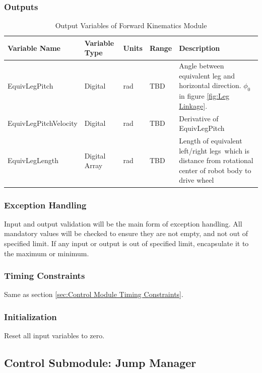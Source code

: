 \documentclass[12pt]{article}
\begin{document}
        \subsubsection{Outputs}
            \begin{table}[H]
              \centering
                \caption{Output Variables of Forward Kinematics Module} \label{tbl:Output Variables of Forward Kinematics Module}
              \begin{tabularx}{\textwidth}{|p{6cm}|p{1.2cm}|p{1.2cm}|p{1cm}|X|}
                \hline Variable Name & Variable Type & Units & Range & Description \\
                \hline EquivLegPitch & Digital & rad & TBD & Angle between equivalent leg and horizontal direction. $\phi_0$ in figure \ref{fig:Leg Linkage}.\\
                \hline EquivLegPitchVelocity & Digital & rad & TBD & Derivative of EquivLegPitch\\
                \hline EquivLegLength & Digital Array & rad & TBD & Length of equivalent left/right legs\, which is distance from rotational center of robot body to drive wheel\\
                \hline
              \end{tabularx}
            \end{table}
            
        \subsubsection{Exception Handling}
            Input and output validation will be the main form of exception handling. All mandatory values will be checked to ensure they are not empty, and not out of specified limit. If any input or output is out of specified limit, encapsulate it to the maximum or minimum.
        \subsubsection{Timing Constraints}
            Same as section \ref{sec:Control Module Timing Constraints}.
        \subsubsection{Initialization}
            Reset all input variables to zero.
        
    \subsection{Control Submodule: Jump Manager} \label{sec:Jump Manager}
\end{document}
